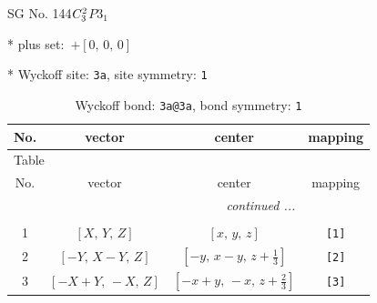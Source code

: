 \documentclass[fleqn,8pt]{jsarticle}
\begin{document}
\setcounter{MaxMatrixCols}{32}

\renewcommand{\tablename}{Table~}
\renewcommand{\figurename}{Figure~}
\begin{center}
\LARGE
SG No. 144\quad$C_{\rm 3}^{2}$\quad$P3_1$\quad[ trigonal ]
\end{center}

* plus set:\,\,\,$+\left[ 0,\, 0,\, 0 \right]$


* Wyckoff site: {\tt 3a}, site symmetry: {\tt 1}
\renewcommand{\arraystretch}{1.2}
\begin{longtable}{cccc}
\caption{Wyckoff bond: {\tt 3a@3a}, bond symmetry: {\tt 1}}
 \\
 \hline \hline
No. & vector & center & mapping \\ \hline \endfirsthead

\multicolumn{3}{l}{\tablename\ \thetable{}} \\
 \hline \hline
No. & vector & center & mapping \\ \hline \endhead

 \hline \hline
\multicolumn{3}{r}{\footnotesize\it continued ...} \\ \endfoot

 \hline \hline
\multicolumn{3}{r}{} \\ \endlastfoot

1 & $\left[ X,\, Y,\, Z \right]$ & $\left[ x,\, y,\, z \right]$ & {\tt [1]} \\ \hline
2 & $\left[ - Y,\, X - Y,\, Z \right]$ & $\left[ - y,\, x - y,\, z + \frac{1}{3} \right]$ & {\tt [2]} \\ \hline
3 & $\left[ - X + Y,\, - X,\, Z \right]$ & $\left[ - x + y,\, - x,\, z + \frac{2}{3} \right]$ & {\tt [3]} \\
\end{longtable}
\end{document}

